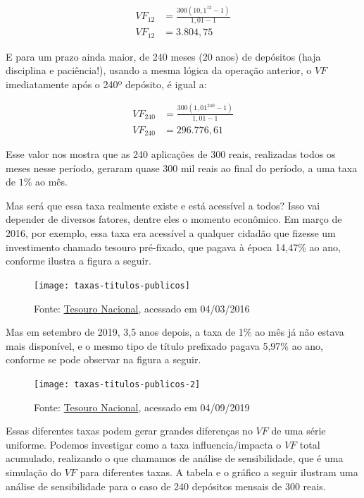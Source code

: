 \begin{align*}
VF_{12}&=\frac{300(10{,}1^{12}-1)}{1{,}01-1}\\
VF_{12}&=3.804{,}75
\end{align*}

E para um prazo ainda maior, de 240 meses (20 anos) de depósitos (haja disciplina e paciência!), usando a mesma lógica da operação anterior, o $VF$ imediatamente após o 240º depósito, é igual a:

\begin{align*}
VF_{240}&=\frac{300(1{,}01^{240}-1)}{1,01-1}\\
VF_{240}&=296.776{,}61
\end{align*}

Esse valor nos mostra que as 240 aplicações de 300 reais, realizadas todos os meses nesse período, geraram quase 300 mil reais ao final do período, a uma taxa de $1$\% ao mês. 


Mas será que essa taxa realmente existe e está acessível a todos? Isso vai depender de diversos fatores, dentre eles o momento econômico. Em março de 2016, por exemplo, essa taxa era acessível a qualquer cidadão que fizesse um investimento chamado tesouro pré-fixado, que pagava à época 14,47\% ao ano, conforme ilustra a figura a seguir.

\begin{figure}[H]

\centering
\texttt{[image: taxas-titulos-publicos]}
\caption{Fonte: \href{http://www.tesouro.fazenda.gov.br/tesouro-direto-precos-e-taxas-dos-titulos}{Tesouro Nacional}, acessado em 04/03/2016}

\end{figure}

Mas em setembro de 2019, 3,5 anos depois, a taxa de 1\% ao mês já não estava mais disponível, e o mesmo tipo de título prefixado pagava 5,97\% ao ano, conforme se pode observar na figura a seguir.

\begin{figure}[H]

\centering
\texttt{[image: taxas-titulos-publicos-2]}
\caption{Fonte: \href{http://www.tesouro.fazenda.gov.br/tesouro-direto-precos-e-taxas-dos-titulos}{Tesouro Nacional}, acessado em 04/09/2019}

\end{figure}

Essas diferentes taxas podem gerar grandes diferenças no $VF$ de uma série uniforme. Podemos investigar como a taxa influencia/impacta o $VF$ total acumulado, realizando o que chamamos de análise de sensibilidade, que é uma simulação do $VF$ para diferentes taxas. A tabela e o gráfico a seguir ilustram uma análise de sensibilidade para o caso de 240 depósitos mensais de 300 reais.

